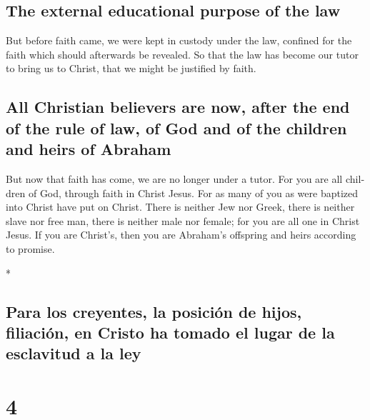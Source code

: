 \begin{paracol}{2}
\begin{otherlanguage}{english}
{\subsection{The external educational purpose of the
law}\label{the-external-educational-purpose-of-the-law}}

 But before faith came, we were kept in custody under the
law, confined for the faith which should afterwards be revealed.
 So that the law has become our tutor to bring us to
Christ, that we might be justified by faith.

\hypertarget{all-christian-believers-are-now-after-the-end-of-the-rule-of-law-of-god-and-of-the-children-and-heirs-of-abraham}{%
\subsection{All Christian believers are now, after the end of the rule
of law, of God and of the children and heirs of
Abraham}\label{all-christian-believers-are-now-after-the-end-of-the-rule-of-law-of-god-and-of-the-children-and-heirs-of-abraham}}

 But now that faith has come, we are no longer under a
tutor.  For you are all children of God, through faith in
Christ Jesus.  For as many of you as were baptized into
Christ have put on Christ.  There is neither Jew nor
Greek, there is neither slave nor free man, there is neither male nor
female; for you are all one in Christ Jesus.  If you are
Christ's, then you are Abraham's offspring and heirs according to
promise.

\end{otherlanguage}

\switchcolumn[0]*

\hypertarget{para-los-creyentes-la-posiciuxf3n-de-hijos-filiaciuxf3n-en-cristo-ha-tomado-el-lugar-de-la-esclavitud-a-la-ley}{%
\subsection{Para los creyentes, la posición de hijos, filiación, en
Cristo ha tomado el lugar de la esclavitud a la
ley}\label{para-los-creyentes-la-posiciuxf3n-de-hijos-filiaciuxf3n-en-cristo-ha-tomado-el-lugar-de-la-esclavitud-a-la-ley}}

\hypertarget{section-6}{%
\section{4}\label{section-6}}


\end{paracol}
